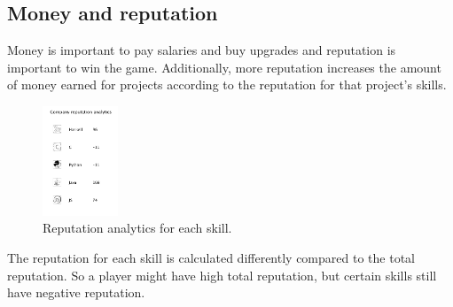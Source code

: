 \documentclass[11pt]{article}
\begin{document}
\begin{multicols}{2}
\section{Money and reputation}
\noindent
Money is important to pay salaries and buy upgrades and reputation is important to win the game. Additionally, more reputation increases the amount of money earned for projects according to the reputation for that project's skills. 
\begin{figure}[H]
\centering
\includegraphics[width=0.2\textwidth, keepaspectratio]{imgs/reputation.png}
\caption{Reputation analytics for each skill.}
\end{figure}
\noindent
The reputation for each skill is calculated differently compared to the total reputation. So a player might have high total reputation, but certain skills still have negative reputation. 

\end{multicols}
\end{document}

